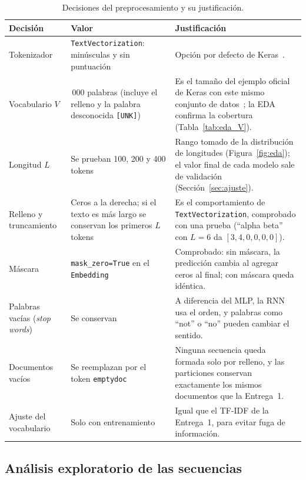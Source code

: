 \documentclass[12pt, a4paper]{article}
\begin{document}
\begin{table}[H]
\centering
\caption{Decisiones del preprocesamiento y su justificación.}
\label{tab:decisiones_datos}
\small
\begin{tabularx}{\linewidth}{>{\raggedright\arraybackslash}p{2.6cm} >{\raggedright\arraybackslash}p{4.2cm} X}
\toprule
\textbf{Decisión} & \textbf{Valor} & \textbf{Justificación} \\
\midrule
Tokenizador & \texttt{TextVectorization}: minúsculas y sin puntuación & Opción por defecto de Keras~\cite{kerasdocs}. \\
Vocabulario $V$ & 20\,000 palabras (incluye el relleno y la palabra desconocida \texttt{[UNK]}) & Es el tamaño del ejemplo oficial de Keras con este mismo conjunto de datos~\cite{kerasglove}; la EDA confirma la cobertura (Tabla~\ref{tab:eda_V}). \\
Longitud $L$ & Se prueban 100, 200 y 400 tokens & Rango tomado de la distribución de longitudes (Figura~\ref{fig:eda}); el valor final de cada modelo sale de validación (Sección~\ref{sec:ajuste}). \\
Relleno y truncamiento & Ceros a la derecha; si el texto es más largo se conservan los primeros $L$ tokens & Es el comportamiento de \texttt{TextVectorization}, comprobado con una prueba (``alpha beta'' con $L=6$ da $[3, 4, 0, 0, 0, 0]$). \\
Máscara & \texttt{mask\_zero=True} en el \texttt{Embedding} & Comprobado: sin máscara, la predicción cambia al agregar ceros al final; con máscara queda idéntica. \\
Palabras vacías (\textit{stop words}) & Se conservan & A diferencia del MLP, la RNN usa el orden, y palabras como ``not'' o ``no'' pueden cambiar el sentido. \\
Documentos vacíos & Se reemplazan por el token \texttt{emptydoc} & Ninguna secuencia queda formada solo por relleno, y las particiones conservan exactamente los mismos documentos que la Entrega~1. \\
Ajuste del vocabulario & Solo con entrenamiento & Igual que el TF-IDF de la Entrega~1, para evitar fuga de información. \\
\bottomrule
\end{tabularx}
\end{table}

\subsection{Análisis exploratorio de las secuencias}
\end{document}
